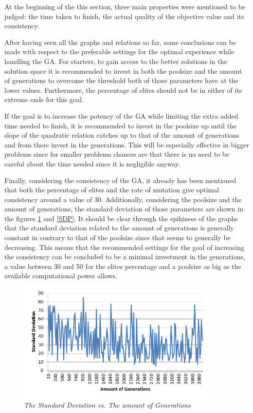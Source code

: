 \par
At the beginning of the this section, three main properties were mentioned to be judged: the time taken to finish, the actual quality of the objective value and its consistency.
\par
After having seen all the graphs and relations so far, some conclusions can be made with respect to the preferable settings for the optimal experience while handling the GA. For starters, to gain access to the better solutions in the solution space it is recommended to invest in both the poolsize and the amount of generations to overcome the threshold both of those parameters have at the lower values. Furthermore, the percentage of elites should not be in either of its extreme ends for this goal.
\par
If the goal is to increase the potency of the GA while limiting the extra added time needed to finish, it is recommended to invest in the poolsize up until the slope of the quadratic relation catches up to that of the amount of generations and from there invest in the generations. This will be especially effective in bigger problems since for smaller problems chances are that there is no need to be careful about the time needed since it is negligible anyway.
\par
Finally, considering the consistency of the GA, it already has been mentioned that both the percentage of elites and the rate of mutation give optimal consistency around a value of 30. Additionally, considering the poolsize and the amount of generations, the standard deviation of those parameters are shown in the figures \ref{SDG} and \ref{SDP}. It should be clear through the spikiness of the graphs that the standard deviation related to the amount of generations is generally constant in contrary to that of the poolsize since that seems to generally be decreasing. This means that the recommended settings for the goal of increasing the consistency can be concluded to be a minimal investment in the generations, a value between 30 and 50 for the elites percentage and a poolsize as big as the available computational power allows.

\begin{figure}[H] 
	\centering
	\includegraphics[height=6cm]{SDG}
	\caption{\textsl{The Standard Deviation vs. The amount of Generations}}
	\label{SDG}
\end{figure}

